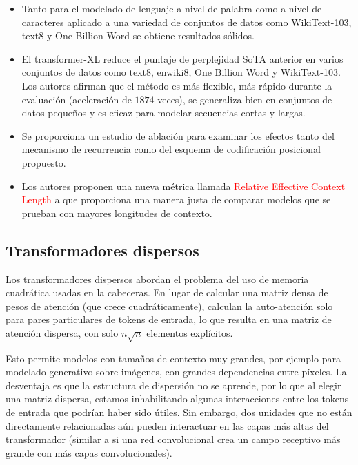 \documentclass[conference]{IEEEtran}
\begin{document}
\begin{itemize}
\item Tanto para el modelado de lenguaje a nivel de palabra como a nivel de caracteres aplicado a una variedad de conjuntos de datos como WikiText-103, text8 y One Billion Word se obtiene resultados s\'olidos.
\item El transformer-XL reduce el puntaje de perplejidad SoTA anterior en varios conjuntos de datos como text8, enwiki8, One Billion Word y WikiText-103. Los autores afirman que el m\'etodo es m\'as flexible, m\'as r\'apido durante la evaluaci\'on (aceleraci\'on de $1874$ veces), se generaliza bien en conjuntos de datos peque\~nos y es eficaz para modelar secuencias cortas y largas.
\item Se proporciona un estudio de ablaci\'on para examinar los efectos tanto del mecanismo de recurrencia como del esquema de codificaci\'on posicional propuesto.

\item Los autores proponen una nueva m\'etrica llamada \textcolor{red}{Relative Effective Context Length} a que proporciona una manera justa de comparar modelos que se prueban con mayores longitudes de contexto.

\end{itemize}

\subsection{Transformadores dispersos}

Los transformadores dispersos abordan el problema del uso de memoria cuadr\'atica usadas en la cabeceras. En lugar de calcular una matriz densa de pesos de atenci\'on (que crece cuadr\'aticamente), calculan la auto-atenci\'on solo para pares particulares de tokens de entrada, lo que resulta en una matriz de atenci\'on dispersa, con solo $n\sqrt{n}$ elementos expl\'icitos.

\vspace{0.2cm}

Esto permite modelos con tama\~nos de contexto muy grandes, por ejemplo para modelado generativo sobre im\'agenes, con grandes dependencias entre p\'ixeles. La desventaja es que la estructura de dispersi\'on no se aprende, por lo que al elegir una matriz dispersa, estamos inhabilitando algunas interacciones entre los tokens de entrada que podr\'ian haber sido \'utiles. Sin embargo, dos unidades que no est\'an directamente relacionadas a\'un pueden interactuar en las capas m\'as altas del transformador (similar a si una red convolucional crea un campo receptivo m\'as grande con m\'as capas convolucionales).
\end{document}
